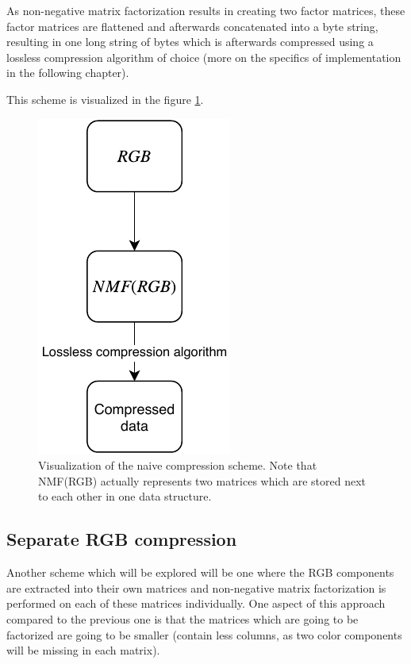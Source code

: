 \documentclass[thesis=M,english]{FITthesis}[2012/10/20]
\begin{document}
As non-negative matrix factorization results in creating two factor
matrices, these factor matrices are flattened and afterwards concatenated into
a byte string, resulting in one long string of bytes which is afterwards
compressed using a lossless compression algorithm of choice (more on the specifics of
implementation in the following chapter).

This scheme is visualized in the figure \ref{fig:nmf-naive-scheme}.

\begin{figure}[h]
  \centering
  \includegraphics{nmf-naive-scheme}
  \caption[Visualization of the naive compression scheme]{Visualization of the naive compression scheme. Note that NMF(RGB) actually
  represents two matrices which are stored next to each other in one data structure.}
  \label{fig:nmf-naive-scheme}
\end{figure}

\subsection{Separate RGB compression}
Another scheme which will be explored will be one where the RGB components
are extracted into their own matrices and non-negative matrix factorization
is performed on each of these matrices individually. One aspect of this approach
compared to the previous one is that the matrices which are going to be factorized
are going to be smaller (contain less columns, as two color components will be missing
in each matrix).
\end{document}
